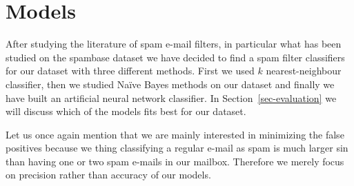 \documentclass[11pt,a4paper]{article}
\begin{document}
\section{Models}
\label{sec-models}

After studying the literature of spam e-mail filters, in particular what has been studied on the spambase dataset we have decided to find a spam filter classifiers for our dataset with three different methods. First we used $k$ nearest-neighbour classifier, then we studied Na\"ive Bayes methods on our dataset and finally we have built an artificial neural network classifier. In Section~\ref{sec-evaluation} we will discuss which of the models fits best for our dataset.

Let us once again mention that we are mainly interested in minimizing the false positives because we thing classifying a regular e-mail as spam is much larger sin than having one or two spam e-mails in our mailbox. Therefore we merely focus on precision rather than accuracy of our models.

\newpage
\noindent
{}

\smallskip
\end{document}
